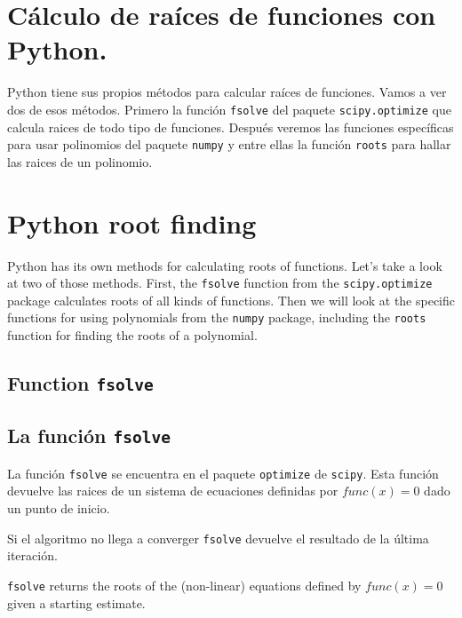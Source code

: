 \begin{paracol}{2}

\section{Cálculo de raíces de funciones con Python.}

Python tiene sus propios métodos para calcular raíces de funciones. Vamos a ver dos de esos métodos. Primero la función  \texttt{fsolve} del paquete \texttt{scipy.optimize} que calcula raices de todo tipo de funciones. Después veremos las funciones específicas para usar polinomios del paquete \texttt{numpy} y entre ellas la función \texttt{roots} para hallar las raices de un polinomio.

\switchcolumn

\section{Python root finding}

Python has its own methods for calculating roots of functions. Let's take a look at two of those methods. First, the \texttt{fsolve} function from the \texttt{scipy.optimize} package calculates roots of all kinds of functions. Then we will look at the specific functions for using polynomials from the \texttt{numpy} package, including the \texttt{roots} function for finding the roots of a polynomial.

\subsection{Function \texttt{fsolve}}

\switchcolumn

\subsection{La función \texttt{fsolve}}

La función \texttt{fsolve} se encuentra en el paquete \texttt{optimize} de \texttt{scipy}. Esta función devuelve las raices de un sistema de ecuaciones definidas por $func(x)=0$ dado un punto de inicio.

Si el algoritmo no llega a converger \texttt{fsolve} devuelve el resultado de la última iteración.

\switchcolumn
\texttt{fsolve} returns the roots of the (non-linear) equations defined by $func(x) = 0$ given a starting estimate.


\end{paracol}
